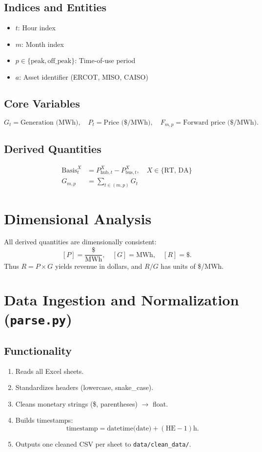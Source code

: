 \documentclass[12pt]{article}
\begin{document}
\subsection{Indices and Entities}
\begin{itemize}
    \item \( t \): Hour index
    \item \( m \): Month index
    \item \( p \in \{\text{peak}, \text{off\_peak}\} \): Time-of-use period
    \item \( a \): Asset identifier (ERCOT, MISO, CAISO)
\end{itemize}

\subsection{Core Variables}
\[
G_t = \text{Generation (MWh)}, \quad
P_t = \text{Price (\$/MWh)}, \quad
F_{m,p} = \text{Forward price (\$/MWh)}.
\]

\subsection{Derived Quantities}
\begin{align*}
\text{Basis}^X_t &= P^X_{\text{hub},t} - P^X_{\text{bus},t}, \quad X \in \{\text{RT, DA}\} \\
G_{m,p} &= \sum_{t \in (m,p)} G_t
\end{align*}

\section{Dimensional Analysis}
All derived quantities are dimensionally consistent:
\[
[P] = \frac{\$}{\text{MWh}}, \quad [G] = \text{MWh}, \quad [R] = \$.
\]
Thus \( R = P \times G \) yields revenue in dollars, and \( R / G \) has units of \$/MWh.

\section{Data Ingestion and Normalization (\texttt{parse.py})}
\subsection{Functionality}
\begin{enumerate}[label=\alph*)]
    \item Reads all Excel sheets.
    \item Standardizes headers (lowercase, snake\_case).
    \item Cleans monetary strings (\$, parentheses) $\to$ float.
    \item Builds timestamps:
    \[
    \text{timestamp} = \text{datetime(date)} + (\text{HE}-1)\text{h}.
    \]
    \item Outputs one cleaned CSV per sheet to \texttt{data/clean\_data/}.
\end{enumerate}
\end{document}
